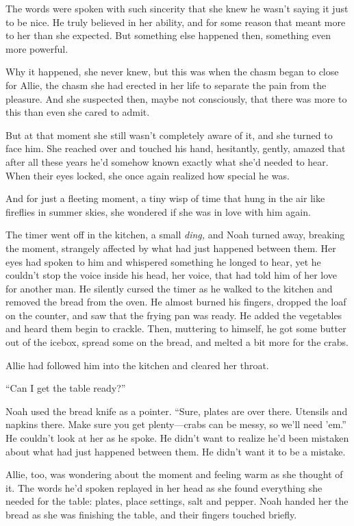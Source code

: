 \documentclass[10pt, twoside, openright]{book}
\begin{document}
The words were spoken with such sincerity that she knew he wasn't saying
it just to be nice. He truly believed in her ability, and for some
reason that meant more to her than she expected. But something else
happened then, something even more powerful.

Why it happened, she never knew, but this was when the chasm began to
close for Allie, the chasm she had erected in her life to separate the
pain from the pleasure. And she suspected then, maybe not consciously,
that there was more to this than even she cared to admit.

But at that moment she still wasn't completely aware of it, and she
turned to face him. She reached over and touched his hand, hesitantly,
gently, amazed that after all these years he'd somehow known exactly
what she'd needed to hear. When their eyes locked, she once again
realized how special he was.

And for just a fleeting moment, a tiny wisp of time that hung in the air
like fireflies in summer skies, she wondered if she was in love with him
again.

The timer went off in the kitchen, a small \emph{ding,} and Noah turned
away, breaking the moment, strangely affected by what had just happened
between them. Her eyes had spoken to him and whispered something he
longed to hear, yet he couldn't stop the voice inside his head, her
voice, that had told him of her love for another man. He silently cursed
the timer as he walked to the kitchen and removed the bread from the
oven. He almost burned his fingers, dropped the loaf on the counter, and
saw that the frying pan was ready. He added the vegetables and heard
them begin to crackle. Then, muttering to himself, he got some butter
out of the icebox, spread some on the bread, and melted a bit more for
the crabs.


Allie had followed him into the kitchen and cleared her throat.

``Can I get the table ready?''


Noah used the bread knife as a pointer. ``Sure, plates are over there.
Utensils and napkins there. Make sure you get plenty---crabs can be
messy, so we'll need 'em.'' He couldn't look at her as he spoke. He
didn't want to realize he'd been mistaken about what had just happened
between them. He didn't want it to be a mistake.

Allie, too, was wondering about the moment and feeling warm as she
thought of it. The words he'd spoken replayed in her head as she found
everything she needed for the table: plates, place settings, salt and
pepper. Noah handed her the bread as she was finishing the table, and
their fingers touched briefly.
\end{document}
